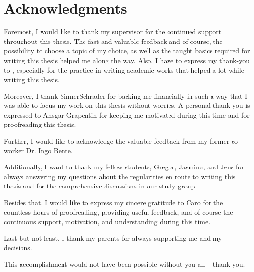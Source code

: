 \chapter*{Acknowledgments}
\thispagestyle{noheader}

Foremost, I would like to thank my supervisor \firstTutor{} for the continued support throughout this thesis. The fast and valuable feedback and of course, the possibility to choose a topic of my choice, as well as the taught basics required for writing this thesis helped me along the way. Also, I have to express my thank-you to \secondTutor, especially for the practice in writing academic works that helped a lot while writing this thesis.

Moreover, I thank SinnerSchrader for backing me financially in such a way that I was able to focus my work on this thesis without worries. A personal thank-you is expressed to Ansgar Grapentin for keeping me motivated during this time and for proofreading this thesis.

Further, I would like to acknowledge the valuable feedback from my former co-worker Dr. Ingo Bente.

Additionally, I want to thank my fellow students, Gregor, Jasmina, and Jens for always answering my questions about the regularities en route to writing this thesis and for the comprehensive discussions in our study group.

Besides that, I would like to express my sincere gratitude to Caro for the countless hours of proofreading, providing useful feedback, and of course the continuous support, motivation, and understanding during this time.

Last but not least, I thank my parents for always supporting me and my decisions.

This accomplishment would not have been possible without you all -- thank you.

\newpage